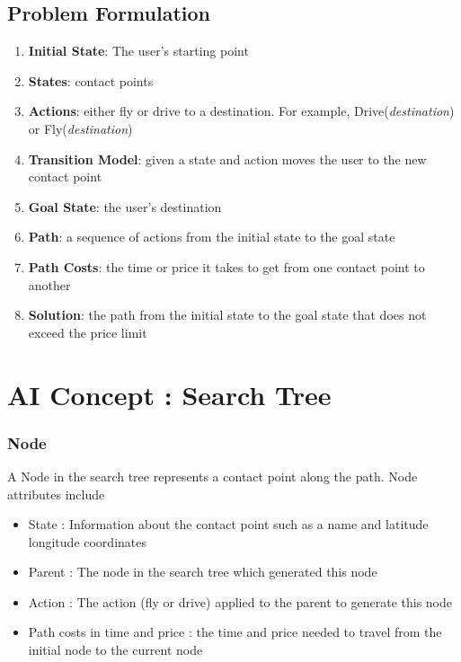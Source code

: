 \documentclass[11pt]{article}
\begin{document}
\subsection{Problem Formulation}
\begin{enumerate}
\item \textbf{Initial State}: The user's starting point
\item \textbf{States}: contact points
\item	 \textbf{Actions}: either fly or drive to a destination. For example, Drive(\emph{destination}) or Fly(\emph{destination})
\item \textbf{Transition Model}: given a state and action moves the user to the new contact point
\item \textbf{Goal State}: the user's destination
\item \textbf{Path}: a sequence of actions from the initial state to the goal state
\item \textbf{Path Costs}: the time or price it takes to get from one contact point to another %
\item \textbf{Solution}: the path from the initial state to the goal state that does not exceed the price limit
\end{enumerate}


\section{AI Concept : Search Tree}

\subsubsection{Node} A Node in the search tree represents a contact point along the path. Node attributes include
\begin{itemize}
\item State : Information about the contact point such as a name and latitude longitude coordinates
\item Parent : The node in the search tree which generated this node
\item Action : The action (fly or drive) applied to the parent to generate this node
\item Path costs in time and price : the time and price needed to travel from the initial node to the current node
\end{itemize}
\end{document}
